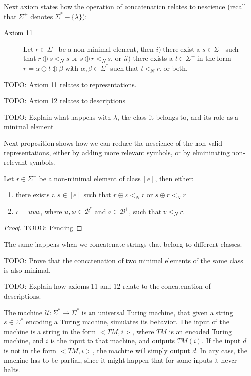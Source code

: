 Next axiom states how the operation of concatenation relates to nescience (recall that $\Sigma^{+}$ denotes $\Sigma^\ast-\{\lambda\}$):

\vskip 0.25cm

\begin{description}
\item[Axiom 11] Let $r \in \Sigma^{+}$ be a non-minimal element, then $i)$ there exist a $s \in \Sigma^{+}$ such that $r \oplus s <_N s$ or $s \oplus r <_N s$, or $ii)$ there exists a $t \in \Sigma^{+}$ in the form $r = \alpha \oplus t \oplus \beta$ with $\alpha, \beta \in \Sigma^\ast$ such that $t <_N r$, or both.
\end{description}

\vskip 0.25cm

{\color{red} TODO: Axiom 11 relates to representations.}

{\color{red} TODO: Axiom 12 relates to descriptions.}

{\color{red} TODO: Explain what happens with $\lambda$, the class it belongs to, and its role as a minimal element.}

Next proposition shows how we can reduce the nescience of the non-valid representations, either by adding more relevant symbols, or by elmininating non-relevant symbols.

\begin{proposition}
Let $r \in \Sigma^{+}$ be a non-minimal element of class $[e]$, then either:
\begin{enumerate}[label=(\roman*)]
\item there exists a $s \in [e]$ such that $r \oplus s <_N r$ or $s \oplus r <_N r$
\item $r$ = $uvw$, where $u, w \in \mathcal{B}^\ast$ and $v \in \mathcal{B}^{+}$, such that $v <_N r$.
\end{enumerate}
\end{proposition}
\begin{proof}
{\color{red} TODO: Pending}
\end{proof}

The same happens when we concatenate strings that belong to different classes.

{\color{red} TODO: Prove that the concatenation of two minimal elements of the same class is also minimal.}

{\color{red} TODO: Explain how axioms 11 and 12 relate to the concatenation of descriptions.}

The machine $\mathcal{U} : \Sigma^\ast \rightarrow \Sigma^\ast$ is an universal Turing machine, that given a string $s \in \Sigma^\ast$ encoding a Turing machine, simulates its behavior. The input of the machine is a string in the form $<TM, i>$, where $TM$ is an encoded Turing machine, and $i$ is the input to that machine, and outputs $TM(i)$. If the input $d$ is not in the form $<TM, i>$, the machine will simply output $d$. In any case, the machine has to be partial, since it might happen that for some inputs it never halts.

